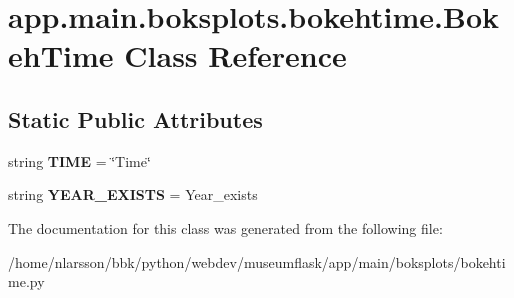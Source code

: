 \hypertarget{classapp_1_1main_1_1boksplots_1_1bokehtime_1_1BokehTime}{}\section{app.\+main.\+boksplots.\+bokehtime.\+Bokeh\+Time Class Reference}
\label{classapp_1_1main_1_1boksplots_1_1bokehtime_1_1BokehTime}
\subsection*{Static Public Attributes}
\begin{DoxyCompactItemize}
\item 
\mbox{\label{classapp_1_1main_1_1boksplots_1_1bokehtime_1_1BokehTime_ad7d08589fada4efb5cc216c6d8fa26bc}} 
string {\bfseries T\+I\+ME} = \char`\"{}Time\char`\"{}
\item 
\mbox{\label{classapp_1_1main_1_1boksplots_1_1bokehtime_1_1BokehTime_a48ab44982b2cfb074ed10d5410e03ff9}} 
string {\bfseries Y\+E\+A\+R\+\_\+\+E\+X\+I\+S\+TS} = \textquotesingle{}Year\+\_\+exists\textquotesingle{}
\end{DoxyCompactItemize}


The documentation for this class was generated from the following file\+:\begin{DoxyCompactItemize}
\item 
/home/nlarsson/bbk/python/webdev/museumflask/app/main/boksplots/bokehtime.\+py\end{DoxyCompactItemize}
